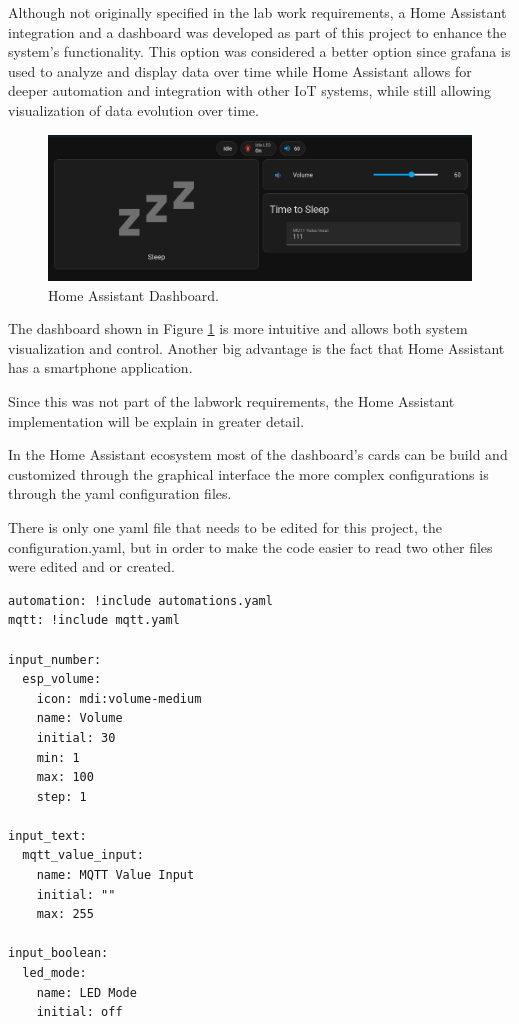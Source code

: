 Although not originally specified in the lab work requirements, a Home Assistant integration and a dashboard was developed as part of this project to enhance the system's functionality. This option was considered a better option since grafana is used to analyze and display data over time while Home Assistant allows for deeper automation and integration with other IoT systems, while still allowing visualization of data evolution over time. 

\begin{figure}[H]
    \centering
    \includegraphics*[scale = 0.5]{Images/HADashboard.png}
    \caption{Home Assistant Dashboard.}
    \label{fig:HADashboard}
\end{figure}

The dashboard shown in Figure \ref{fig:HADashboard} is more intuitive and allows both system visualization and control. Another big advantage is the fact that Home Assistant has a smartphone application.

Since this was not part of the labwork requirements, the Home Assistant implementation will be explain in greater detail. 

In the Home Assistant ecosystem most of the dashboard's cards can be build and customized through the graphical interface the more complex configurations is through the yaml configuration files. 

There is only one yaml file that needs to be edited for this project, the configuration.yaml, but in order to make the code easier to read two other files were edited and or created. 

\begin{verbatim}
automation: !include automations.yaml
mqtt: !include mqtt.yaml

input_number:
  esp_volume:
    icon: mdi:volume-medium
    name: Volume
    initial: 30
    min: 1
    max: 100
    step: 1

input_text:
  mqtt_value_input:
    name: MQTT Value Input
    initial: ""
    max: 255

input_boolean:
  led_mode:
    name: LED Mode
    initial: off
\end{verbatim}


